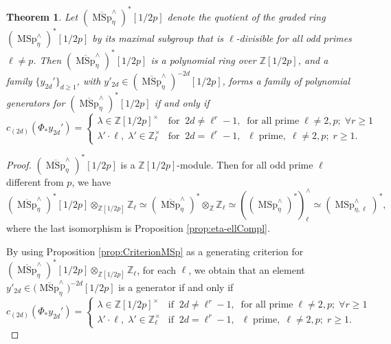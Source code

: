 \documentclass[10pt]{amsart}
\theoremstyle{definition}
\theoremstyle{plain}
\newtheorem{thm}[defn]{Theorem}
\numberwithin{equation}{section}
\newcommand{\0}{\emptyset}
\newcommand{\Z}{{\mathbb Z}}
\newcommand{\MSp}{{\operatorname{MSp}}}
\begin{document}
\begin{thm}
\label{thm:FinalResult}
    Let $({\overline{\MSp}^\wedge_\eta})^*[1/2p]$ denote the quotient of the graded ring $({\MSp^\wedge_\eta})^*[1/2p]$ by its maximal subgroup that is $\ell$-divisible for all odd primes $\ell \neq p$. Then $({\overline{\MSp}^\wedge_\eta})^*[1/2p]$ is a polynomial ring over $\Z[1/2p]$, and a family $\{y_{2d}'\}_{d \ge 1}$, with $y'_{2d} \in ({\overline{\MSp}^\wedge_\eta})^{-2d}[1/2p]$, forms a family of polynomial generators for $({\overline{\MSp}^\wedge_\eta})^*[1/2p]$ if and only if 
    \begin{equation*}
        c_{(2d)}(\Phi_* y_{2d}')=
        \begin{cases}
            \lambda \in \Z[1/2p]^\times & \text{for} \; \; 2d \neq \ell^r-1, \; \; \text{for all prime} \;  \ell \neq 2,p; \; \forall r \ge 1 \\
            \lambda' \cdot \ell, \; \lambda' \in \Z_\ell^\times & \text{for} \; \; 2d= \ell^r-1, \; \; \ell \; \text{prime}, \; \ell \neq 2,p; \; r\ge 1.
        \end{cases}
    \end{equation*}
\end{thm}

\begin{proof} $(\overline{\MSp}_\eta^\wedge)^*[1/2p]$ is a $\Z[1/2p]$-module. Then for all odd prime $\ell$ different from $p$, we have 
    $$(\overline{\MSp}_\eta^\wedge)^*[1/2p] \otimes_{\Z[1/2p]}\Z_\ell \simeq  (\overline{\MSp}_\eta^\wedge)^* \otimes_\Z \Z_\ell \simeq ((\MSp_\eta^\wedge)^*)^\wedge_\ell \simeq (\MSp_{\eta,\ell}^\wedge)^*,$$
    where the last isomorphism is Proposition \ref{prop:eta-ellCompl}.

    By using Proposition \ref{prop:CriterionMSp} as a generating criterion for $(\overline{\MSp}_\eta^\wedge)^*[1/2p] \otimes_{\Z[1/2p]}\Z_\ell$, for each $\ell$, we obtain that an element $y'_{2d} \in {(\overline{\MSp}^\wedge_\eta})^{-2d}[1/2p]$ is a generator if and only if
    \begin{equation*}
    c_{(2d)}(\Phi_* y_{2d}')=
        \begin{cases}
            \lambda \in \Z[1/2p]^\times & \text{if} \; \; 2d \neq \ell^r-1, \; \; \text{for all prime} \;  \ell \neq 2,p; \; \forall r \ge 1 \\
            \lambda' \cdot \ell, \; \lambda' \in \Z_\ell^\times & \text{if} \; \; 2d= \ell^r-1, \; \; \ell \; \text{prime}, \; \ell \neq 2,p; \; r\ge 1.
        \end{cases}
    \end{equation*}

\end{proof}
\end{document}
